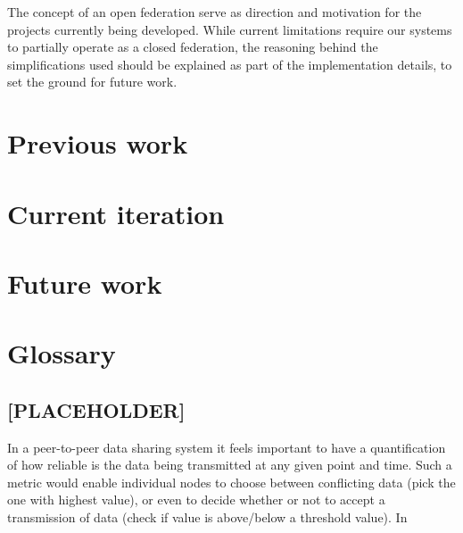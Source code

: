 \documentclass[journal]{IEEEtran}
\begin{document}
The concept of an open federation serve as direction and motivation for the projects currently being developed. While current limitations require our systems to partially operate as a closed federation, the reasoning behind the simplifications used should be explained as part of the implementation details, to set the ground for future work.

\section{Previous work} \label{sect:PREV_WORK}

\section{Current iteration}

\section{Future work}

\section{Glossary}

\subsection{[PLACEHOLDER]}
	In a peer-to-peer data sharing system it feels important to have a quantification of how reliable is the data being transmitted at any given point and time. Such a metric would enable individual nodes to choose between conflicting data (pick the one with highest value), or even to decide whether or not to accept a transmission of data (check if value is above/below a threshold value). In 





	
\end{document}
